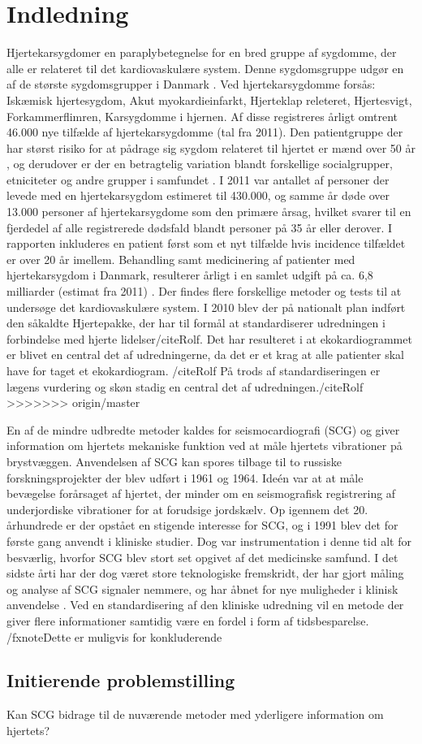 \chapter{Indledning} \label{Indledning}

\textquotedbl Hjertekarsygdom\textquotedbl er en paraplybetegnelse for en bred gruppe af sygdomme, der alle er relateret til det kardiovaskulære system. Denne sygdomsgruppe udgør en af de største sygdomsgrupper i Danmark \cite{livet}. Ved hjertekarsygdomme forsås: Iskæmisk hjertesygdom, Akut myokardieinfarkt, Hjerteklap releteret, Hjertesvigt, Forkammerflimren, Karsygdomme i hjernen\cite{2011}. Af disse registreres årligt omtrent 46.000 nye tilfælde af hjertekarsygdomme (tal fra 2011). Den patientgruppe der har størst risiko for at pådrage sig sygdom relateret til hjertet er mænd over 50 år \cite{2011}, og derudover er der en betragtelig variation blandt forskellige socialgrupper, etniciteter og andre grupper i samfundet \cite{hjerteforening}. I 2011 var antallet af personer der levede med en hjertekarsygdom estimeret til 430.000, og samme år døde over 13.000 personer af hjertekarsygdome som den primære årsag, hvilket svarer til en fjerdedel af alle registrerede dødsfald blandt personer på 35 år eller derover. I rapporten inkluderes en patient først som et nyt tilfælde hvis incidence tilfældet er over 20 år imellem.\cite{2011} Behandling samt medicinering af patienter med hjertekarsygdom i Danmark, resulterer årligt i en samlet udgift på ca. 6,8 milliarder (estimat fra 2011) \cite{hjerteforening}. Der findes flere forskellige metoder og tests til at undersøge det kardiovaskulære system. I 2010 blev der på nationalt plan indført den såkaldte Hjertepakke, der har til formål at standardiserer udredningen i forbindelse med hjerte lidelser/cite{Rolf}. Det har resulteret i at ekokardiogrammet er blivet en central det af udredningerne, da det er et krag at alle patienter skal have for taget et ekokardiogram. /cite{Rolf} På trods af standardiseringen er lægens vurdering og skøn stadig en central det af udredningen./cite{Rolf}
>>>>>>> origin/master


 En af de mindre udbredte metoder kaldes for seismocardiografi (SCG) og giver information om hjertets mekaniske funktion ved at måle hjertets vibrationer på brystvæggen. Anvendelsen af SCG kan spores tilbage til to russiske forskningsprojekter der blev udført  i 1961 og 1964. Ideén var at at måle bevægelse forårsaget af hjertet, der minder om en seismografisk registrering af underjordiske vibrationer for at forudsige jordskælv. Op igennem det 20. århundrede er der opstået en stigende interesse for SCG, og i 1991 blev det for første gang anvendt i kliniske studier. Dog var instrumentation i denne tid alt for besværlig, hvorfor SCG blev stort set opgivet af det medicinske samfund. I det sidste årti har der dog været store teknologiske fremskridt, der har gjort måling og analyse af SCG signaler nemmere, og har åbnet for nye muligheder i klinisk anvendelse \cite{onan} \cite{zanetti}. Ved en standardisering af den kliniske udredning vil en metode der giver flere informationer samtidig være en fordel i form af tidsbesparelse. /fxnote{Dette er muligvis for konkluderende}

\section{Initierende problemstilling} Kan SCG bidrage til de nuværende metoder med yderligere information om hjertets?